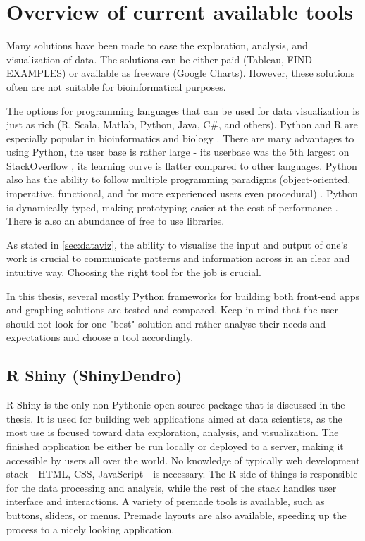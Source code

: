 \chapter{Overview of current available tools}
\label{chap:four}
Many solutions have been made to ease the exploration, analysis, and visualization of data. The solutions can be either paid (Tableau, FIND EXAMPLES) or available as freeware (Google Charts). However, these solutions often are not suitable for bioinformatical purposes. 

The options for programming languages that can be used for data visualization is just as rich (R, Scala, Matlab, Python, Java, C\#, and others). Python and R are especially popular in bioinformatics and biology \citep{giorgi2022r, gentleman2008r, bassi2016python}. There are many advantages to using Python, the user base is rather large - its userbase was the 5th largest on StackOverflow \citep{srinath2017python}, its learning curve is flatter compared to other languages. Python also has the ability to follow multiple programming paradigms (object-oriented, imperative, functional, and for more experienced users even procedural) \citep{srinath2017python, dyer2022exploratory}. Python is dynamically typed, making prototyping easier at the cost of performance \citep{tratt2009dynamically}. There is also an abundance of free to use libraries.

As stated in \ref{sec:dataviz}, the ability to visualize the input and output of one's work is crucial to communicate patterns and information across in an clear and intuitive way. Choosing the right tool for the job is crucial. 

In this thesis, several mostly Python frameworks for building both front-end apps and graphing solutions are tested and compared. Keep in mind that the user should not look for one "best" solution and rather analyse their needs and expectations and choose a tool accordingly. 

\section{R Shiny (ShinyDendro)}
\label{sec:streamlit}
R Shiny is the only non-Pythonic open-source package that is discussed in the thesis. It is used for building web applications aimed at data scientists, as the most use is focused toward data exploration, analysis, and visualization. The finished application be either be run locally or deployed to a server, making it accessible by users all over the world. No knowledge of typically web development stack - HTML, CSS, JavaScript - is necessary. The R side of things is responsible for the data processing and analysis, while the rest of the stack handles user interface and interactions. A variety of premade tools is available, such as buttons, sliders, or menus. Premade layouts are also available, speeding up the process to a nicely looking application.

